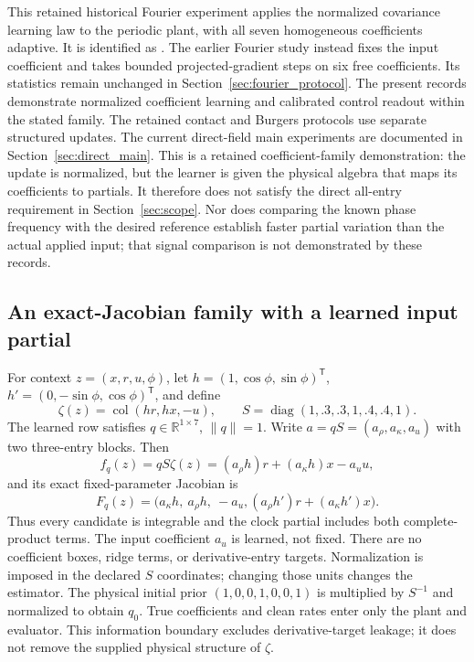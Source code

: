 \documentclass[journal]{IEEEtran}
\newcommand{\col}{\operatorname{col}}
\begin{document}
%
This retained historical Fourier experiment applies the normalized covariance
learning law to
the periodic plant, with all seven homogeneous coefficients adaptive.
It is identified as .
The earlier Fourier study instead fixes the input coefficient and takes
bounded projected-gradient steps on six free coefficients. Its statistics
remain unchanged in Section~\ref{sec:fourier_protocol}. The present records
demonstrate normalized coefficient learning and calibrated control readout
within the stated family. The retained contact and Burgers protocols use
separate structured updates. The current direct-field main experiments are
documented in Section~\ref{sec:direct_main}. This is a retained
coefficient-family demonstration: the update is normalized, but the learner
is given the physical algebra that maps its coefficients to partials.
It therefore does not satisfy the direct all-entry requirement in
Section~\ref{sec:scope}. Nor does comparing the known phase frequency with
the desired reference establish faster partial variation than the actual
applied input; that signal comparison is not demonstrated by these records.

\subsection{An exact-Jacobian family with a learned input partial}
For context $z=(x,r,u,\phi)$, let $h=(1,\cos\phi,\sin\phi)^{\mathsf T}$,
$h'=(0,-\sin\phi,\cos\phi)^{\mathsf T}$, and define
\begin{equation}
 \zeta(z)=\col(hr,hx,-u),\qquad
 S=\operatorname{diag}(1,.3,.3,1,.4,.4,1).
 \label{eq:nf_features}
\end{equation}
The learned row satisfies $q\in\mathbb R^{1\times7}$, $\|q\|=1$.
Write $a=qS=(a_\rho,a_\kappa,a_u)$ with two three-entry blocks. Then
\begin{equation}
 f_q(z)=qS\zeta(z)=(a_\rho h)r+(a_\kappa h)x-a_u u,
 \label{eq:nf_family}
\end{equation}
and its exact fixed-parameter Jacobian is
\begin{equation}
 F_q(z)=\bigl(a_\kappa h,\ a_\rho h,\ -a_u,
                 (a_\rho h')r+(a_\kappa h')x\bigr).
 \label{eq:nf_jacobian}
\end{equation}
Thus every candidate is integrable and the clock partial includes both
complete-product terms. The input coefficient $a_u$ is learned, not fixed.
There are no coefficient boxes, ridge terms, or derivative-entry targets.
Normalization is imposed in the declared $S$ coordinates; changing those
units changes the estimator. The physical initial prior
$(1,0,0,1,0,0,1)$ is multiplied by $S^{-1}$ and normalized to obtain $q_0$.
True coefficients and clean rates enter only the plant and evaluator.
This information boundary excludes derivative-target leakage; it does not
remove the supplied physical structure of $\zeta$.
\end{document}

